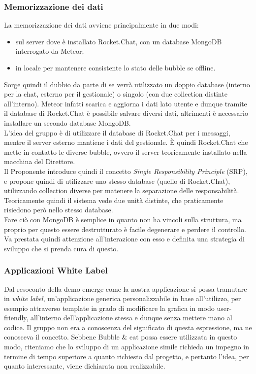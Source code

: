 \subsubsection{Memorizzazione dei dati}
La memorizzazione dei dati avviene principalmente in due modi:
\begin{itemize}
	\item sul server dove è installato Rocket.Chat, con un database MongoDB interrogato da Meteor;
	\item in locale per mantenere consistente lo stato delle bubble se offline.
\end{itemize}
Sorge quindi il dubbio da parte di \Proponente{} se verrà utilizzato un doppio database (interno per la chat, esterno per il gestionale) o singolo (con due collection distinte all'interno). Meteor infatti scarica e aggiorna i dati lato utente e dunque tramite il database di Rocket.Chat è possibile salvare diversi dati, altrimenti è necessario installare un secondo database MongoDB.\\
L'idea del gruppo è di utilizzare il database di Rocket.Chat per i messaggi, mentre il server esterno mantiene i dati del gestionale. È quindi Rocket.Chat che mette in contatto le diverse bubble, ovvero il server teoricamente installato nella macchina del Direttore.\\
Il Proponente introduce quindi il concetto \textit{Single Responsibility Principle} (SRP), e propone quindi di utilizzare uno stesso database (quello di Rocket.Chat), utilizzando collection diverse per matenere la separazione delle responsabilità. Teoricamente quindi il sistema vede due unità distinte, che praticamente risiedono però nello stesso database.\\
Fare ciò con MongoDB è semplice in quanto non ha vincoli sulla struttura, ma proprio per questo essere destrutturato è facile degenerare e perdere il controllo. Va prestata quindi attenzione all'interazione con esso e definita una strategia di sviluppo che si prenda cura di questo.

\subsubsection{Applicazioni White Label}
Dal resoconto della demo emerge come la nostra applicazione si possa tramutare in \textit{white label}, un'applicazione generica personalizzabile in base all'utilizzo, per esempio attraverso template in grado di modificare la grafica in modo user-friendly, all'interno dell'applicazione stessa e dunque senza mettere mano al codice. Il gruppo non era a conoscenza del significato di questa espressione, ma ne conosceva il concetto. Sebbene Bubble \& eat possa essere utilizzata in questo modo, riteniamo che lo sviluppo di un applicazione simile richieda un impegno in termine di tempo superiore a quanto richiesto dal progetto, e pertanto l'idea, per quanto interessante, viene dichiarata non realizzabile.

